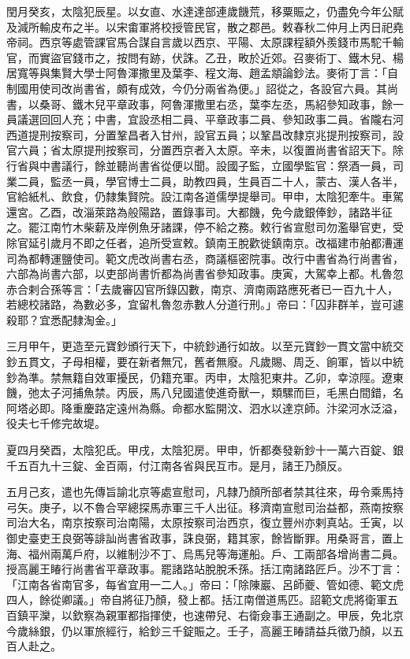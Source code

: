 \begin{pinyinscope}
 閏月癸亥，太陰犯辰星。以女直、水達達部連歲饑荒，移粟賑之，仍盡免今年公賦及減所輸皮布之半。以宋畬軍將校授管民官，散之郡邑。敕春秋二仲月上丙日祀堯帝祠。西京等處管課官馬合謀自言歲以西京、平陽、太原課程額外羨錢市馬駝千輸官，而實盜官錢市之，按問有跡，伏誅。乙丑，畋於近郊。召麥術丁、鐵木兒、楊居寬等與集賢大學士阿魯渾撒里及葉李、程文海、趙孟頫論鈔法。麥術丁言：「自制國用使司改尚書省，頗有成效，今仍分兩省為便。」詔從之，各設官六員。其尚書，以桑哥、鐵木兒平章政事，阿魯渾撒里右丞，葉李左丞，馬紹參知政事，餘一員議選回回人充；中書，宜設丞相二員、平章政事二員、參知政事二員。省隴右河西道提刑按察司，分置鞏昌者入甘州，設官五員；以鞏昌改隸京兆提刑按察司，設官六員；省太原提刑按察司，分置西京者入太原。辛未，以復置尚書省詔天下。除行省與中書議行，餘並聽尚書省從便以聞。設國子監，立國學監官：祭酒一員，司業二員，監丞一員，學官博士二員，助教四員，生員百二十人，蒙古、漢人各半，官給紙札、飲食，仍隸集賢院。設江南各道儒學提舉司。甲申，太陰犯牽牛。車駕還宮。乙酉，改淄萊路為般陽路，置錄事司。大都饑，免今歲銀俸鈔，諸路半征之。罷江南竹木柴薪及岸例魚牙諸課，停不給之務。敕行省宣慰司勿濫舉官吏，受除官延引歲月不即之任者，追所受宣敕。鎮南王脫歡徙鎮南京。改福建市舶都漕運司為都轉運鹽使司。範文虎改尚書右丞，商議樞密院事。改行中書省為行尚書省，六部為尚書六部，以吏部尚書忻都為尚書省參知政事。庚寅，大駕幸上都。札魯忽赤合剌合孫等言：「去歲審囚官所錄囚數，南京、濟南兩路應死者已一百九十人，若總校諸路，為數必多，宜留札魯忽赤數人分道行刑。」帝曰：「囚非群羊，豈可遽殺耶？宜悉配隸淘金。」



 三月甲午，更造至元寶鈔頒行天下，中統鈔通行如故。以至元寶鈔一貫文當中統交鈔五貫文，子母相權，要在新者無冗，舊者無廢。凡歲賜、周乏、餉軍，皆以中統鈔為準。禁無籍自效軍擾民，仍籍充軍。丙申，太陰犯東井。乙卯，幸涼陘。遼東饑，弛太子河捕魚禁。丙辰，馬八兒國遣使進奇獸一，類騾而巨，毛黑白間錯，名阿塔必即。降重慶路定遠州為縣。命都水監開汶、泗水以達京師。汴梁河水泛溢，役夫七千修完故堤。



 夏四月癸酉，太陰犯氐。甲戌，太陰犯房。甲申，忻都奏發新鈔十一萬六百錠、銀千五百九十三錠、金百兩，付江南各省與民互市。是月，諸王乃顏反。



 五月己亥，遣也先傳旨諭北京等處宣慰司，凡隸乃顏所部者禁其往來，毋令乘馬持弓矢。庚子，以不魯合罕總探馬赤軍三千人出征。移濟南宣慰司治益都，燕南按察司治大名，南京按察司治南陽，太原按察司治西京，復立豐州亦剌真站。壬寅，以御史臺吏王良弼等誹訕尚書省政事，誅良弼，籍其家，餘皆斷罪。用桑哥言，置上海、福州兩萬戶府，以維制沙不丁、烏馬兒等海運船。戶、工兩部各增尚書二員。授高麗王睶行尚書省平章政事。罷諸路站脫脫禾孫。括江南諸路匠戶。沙不丁言：「江南各省南官多，每省宜用一二人。」帝曰：「除陳巖、呂師夔、管如德、範文虎四人，餘從卿議。」帝自將征乃顏，發上都。括江南僧道馬匹。詔範文虎將衛軍五百鎮平灤，以欽察為親軍都指揮使，也速帶兒、右衛僉事王通副之。甲辰，免北京今歲絲銀，仍以軍旅經行，給鈔三千錠賑之。壬子，高麗王睶請益兵徵乃顏，以五百人赴之。




\end{pinyinscope}
